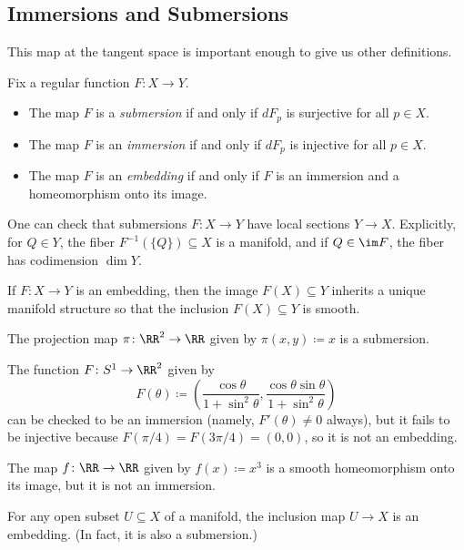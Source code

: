 \documentclass[../notes.tex]{subfiles}
\begin{document}
\subsection{Immersions and Submersions}
This map at the tangent space is important enough to give us other definitions.
\begin{defihelper}   
	Fix a regular function $F\colon X\to Y$.
	\begin{itemize}
		\item The map $F$ is a \textit{submersion} if and only if $dF_p$ is surjective for all $p\in X$.
		\item The map $F$ is an \textit{immersion} if and only if $dF_p$ is injective for all $p\in X$.
		\item The map $F$ is an \textit{embedding} if and only if $F$ is an immersion and a homeomorphism onto its image.
	\end{itemize}
\end{defihelper}
\begin{remark} \label{rem:fiber-submanifold}
	One can check that submersions $F\colon X\to Y$ have local sections $Y\to X$. Explicitly, for $Q\in Y$, the fiber $F^{-1}(\{Q\})\subseteq X$ is a manifold, and if $Q\in\im F$, the fiber has codimension $\dim Y$.
\end{remark}
\begin{remark}
	If $F\colon X\to Y$ is an embedding, then the image $F(X)\subseteq Y$ inherits a unique manifold structure so that the inclusion $F(X)\subseteq Y$ is smooth.
\end{remark}
\begin{example}
	The projection map $\pi\colon\RR^2\to\RR$ given by $\pi(x,y)\coloneqq x$ is a submersion.
\end{example}
\begin{example}[lemniscate]
	The function $F\colon S^1\to\RR^2$ given by
	\[F(\theta)\coloneqq\left(\frac{\cos\theta}{1+\sin^2\theta},\frac{\cos\theta\sin\theta}{1+\sin^2\theta}\right)\]
	can be checked to be an immersion (namely, $F'(\theta)\ne0$ always), but it fails to be injective because $F(\pi/4)=F(3\pi/4)=(0,0)$, so it is not an embedding.
\end{example}
\begin{example}
	The map $f\colon\RR\to\RR$ given by $f(x)\coloneqq x^3$ is a smooth homeomorphism onto its image, but it is not an immersion.
\end{example}
\begin{example}
	For any open subset $U\subseteq X$ of a manifold, the inclusion map $U\to X$ is an embedding. (In fact, it is also a submersion.)
\end{example}
\end{document}
